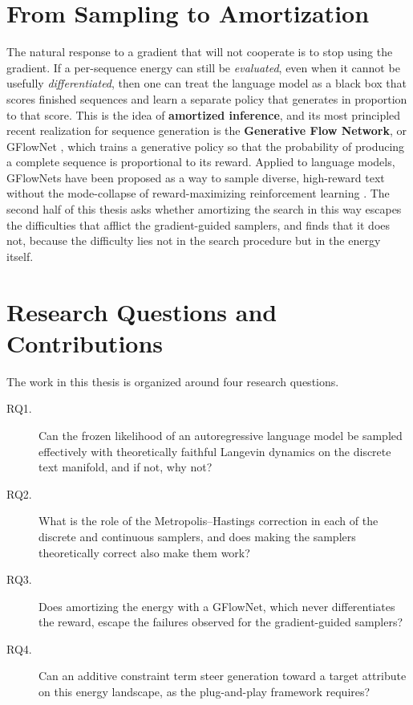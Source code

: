 \section{From Sampling to Amortization}

The natural response to a gradient that will not cooperate is to stop using the gradient. If a per-sequence energy can still be \emph{evaluated}, even when it cannot be usefully \emph{differentiated}, then one can treat the language model as a black box that scores finished sequences and learn a separate policy that generates in proportion to that score. This is the idea of \textbf{amortized inference}, and its most principled recent realization for sequence generation is the \textbf{Generative Flow Network}, or GFlowNet \citep{bengio2021flow, bengio2023gflownet}, which trains a generative policy so that the probability of producing a complete sequence is proportional to its reward. Applied to language models, GFlowNets have been proposed as a way to sample diverse, high-reward text without the mode-collapse of reward-maximizing reinforcement learning \citep{hu2024amortizing}. The second half of this thesis asks whether amortizing the search in this way escapes the difficulties that afflict the gradient-guided samplers, and finds that it does not, because the difficulty lies not in the search procedure but in the energy itself.

\section{Research Questions and Contributions}

The work in this thesis is organized around four research questions.

\begin{description}
    \item[RQ1.] Can the frozen likelihood of an autoregressive language model be sampled effectively with theoretically faithful Langevin dynamics on the discrete text manifold, and if not, why not?
    \item[RQ2.] What is the role of the Metropolis--Hastings correction in each of the discrete and continuous samplers, and does making the samplers theoretically correct also make them work?
    \item[RQ3.] Does amortizing the energy with a GFlowNet, which never differentiates the reward, escape the failures observed for the gradient-guided samplers?
    \item[RQ4.] Can an additive constraint term steer generation toward a target attribute on this energy landscape, as the plug-and-play framework requires?
\end{description}

